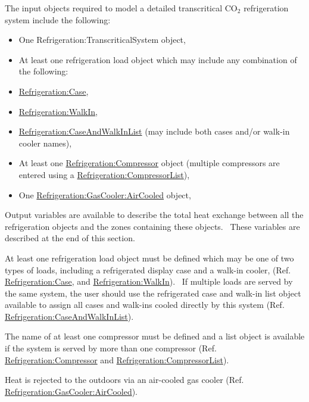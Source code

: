 The input objects required to model a detailed transcritical CO\(_{2}\) refrigeration system include the following:

\begin{itemize}
\item
  One Refrigeration:TranscriticalSystem object,
\item
  At least one refrigeration load object which may include any combination of the following:
\item
  \hyperref[refrigerationcase]{Refrigeration:Case},
\item
  \hyperref[refrigerationwalkin]{Refrigeration:WalkIn},
\item
  \hyperref[refrigerationcaseandwalkinlist]{Refrigeration:CaseAndWalkInList} (may include both cases and/or walk-in cooler names),
\item
  At least one \hyperref[refrigerationcompressor]{Refrigeration:Compressor} object (multiple compressors are entered using a \hyperref[refrigerationcompressorlist]{Refrigeration:CompressorList}),
\item
  One \hyperref[refrigerationgascooleraircooled]{Refrigeration:GasCooler:AirCooled} object,
\end{itemize}

Output variables are available to describe the total heat exchange between all the refrigeration objects and the zones containing these objects.~ These variables are described at the end of this section.

At least one refrigeration load object must be defined which may be one of two types of loads, including a refrigerated display case and a walk-in cooler, (Ref. \hyperref[refrigerationcase]{Refrigeration:Case}, and \hyperref[refrigerationwalkin]{Refrigeration:WalkIn}).~ If multiple loads are served by the same system, the user should use the refrigerated case and walk-in list object available to assign all cases and walk-ins cooled directly by this system (Ref. \hyperref[refrigerationcaseandwalkinlist]{Refrigeration:CaseAndWalkInList}).

The name of at least one compressor must be defined and a list object is available if the system is served by more than one compressor (Ref. \hyperref[refrigerationcompressor]{Refrigeration:Compressor} and \hyperref[refrigerationcompressorlist]{Refrigeration:CompressorList}).

Heat is rejected to the outdoors via an air-cooled gas cooler (Ref. \hyperref[refrigerationgascooleraircooled]{Refrigeration:GasCooler:AirCooled}).

